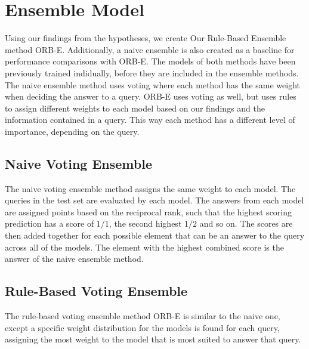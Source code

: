 \section{Ensemble Model}
\label{sec:ensemble_model}
Using our findings from the hypotheses, we create Our Rule-Based Ensemble method ORB-E. Additionally, a naive ensemble is also created as a baseline for performance comparisons with ORB-E.
The models of both methods have been previously trained indidually, before they are included in the ensemble methods.
The naive ensemble method uses voting \cite{MOHAMMED2023757} where each method has the same weight when deciding the answer to a query. ORB-E uses voting as well, but uses rules to assign different weights to each model based on our findings and the information contained in a query. This way each method has a different level of importance, depending on the query.

\subsection{Naive Voting Ensemble}
The naive voting ensemble method assigns the same weight to each model. The queries in the test set are evaluated by each model. The answers from each model are assigned points based on the reciprocal rank, such that the highest scoring prediction has a score of \(1/1\), the second highest \(1/2\) and so on. The scores are then added together for each possible element that can be an answer to the query across all of the models. The element with the highest combined score is the answer of the naive ensemble method.

\subsection{Rule-Based Voting Ensemble}
The rule-based voting ensemble method ORB-E is similar to the naive one, except a specific weight distribution for the models is found for each query, assigning the most weight to the model that is most suited to answer that query.

